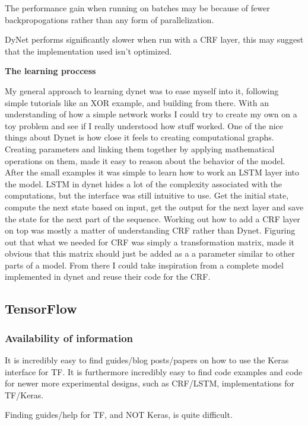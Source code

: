 The performance gain when running on batches may be because of fewer
backpropogations rather than any form of parallelization.

DyNet performs significantly slower when run with a CRF layer, this may suggest
that the implementation used isn't optimized. 



\textbf{The learning proccess}

My general approach to learning dynet was to ease myself into it, following
simple tutorials like an XOR example, and building from there. With an
understanding of how a simple network works I could try to create my own on a
toy problem and see if I really understood how stuff worked. One of the nice
things about Dynet is how close it feels to creating computational graphs.
Creating parameters and linking them together by applying mathematical
operations on them, made it easy to reason about the behavior of the model.
After the small examples it was simple to learn how to work an LSTM layer into
the model. LSTM in dynet hides a lot of the complexity associated with the
computations, but the interface was still intuitive to use. Get the initial
state, compute the next state based on input, get the output for the next layer
and save the state for the next part of the sequence. Working out how to add a
CRF layer on top was mostly a matter of understanding CRF rather than Dynet.
Figuring out that what we needed for CRF was simply a transformation matrix,
made it obvious that this matrix should just be added as a a parameter similar
to other parts of a model. From there I could take inspiration from a complete
model implemented in dynet and reuse their code for the CRF.


\subsection{TensorFlow}

\subsubsection{Availability of information}

It is incredibly easy to find guides/blog posts/papers on how to use the Keras
interface for TF. It is furthermore incredibly easy to find code examples and
code for newer more experimental designs, such as CRF/LSTM, implementations for TF/Keras.

Finding guides/help for TF, and NOT Keras, is quite difficult.

